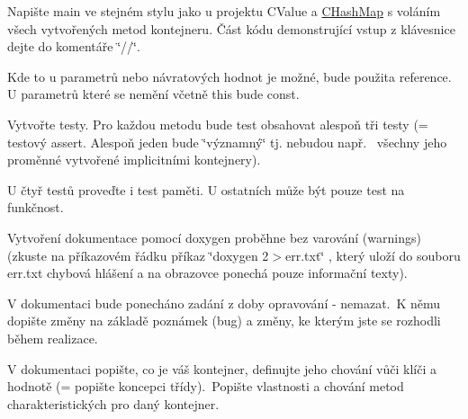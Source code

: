 \begin{DoxyEnumerate}
\item Napište main ve stejném stylu jako u projektu C\+Value a \hyperlink{class_c_hash_map}{C\+Hash\+Map} s voláním všech vytvořených metod kontejneru. Část kódu demonstrující vstup z klávesnice dejte do komentáře \char`\"{}//\char`\"{}.~\newline
~\newline

\item Kde to u parametrů nebo návratových hodnot je možné, bude použita reference. U parametrů které se nemění včetně {\ttfamily this} bude {\ttfamily const}.~\newline
~\newline

\item Vytvořte testy. Pro každou metodu bude test obsahovat alespoň tři testy (= testový {\ttfamily assert}. Alespoň jeden bude \char`\"{}významný\char`\"{} tj. nebudou např.\+  všechny jeho proměnné vytvořené implicitními kontejnery).~\newline
~\newline

\item U čtyř testů proveďte i test paměti. U ostatních může být pouze test na funkčnost.~\newline
~\newline

\item Vytvoření dokumentace pomocí doxygen proběhne bez varování (warnings) (zkuste na příkazovém řádku příkaz {\ttfamily \char`\"{}doxygen 2$>$err.\+txt\char`\"{}} , který uloží do souboru err.\+txt chybová hlášení a na obrazovce ponechá pouze informační texty).~\newline
~\newline

\item V dokumentaci bude ponecháno zadání z doby opravování -\/ nemazat.\+ K němu dopište změny na základě poznámek (bug) a změny, ke kterým jste se rozhodli během realizace.~\newline
~\newline

\item V dokumentaci popište, co je váš kontejner, definujte jeho chování vůči klíči a hodnotě (= popište koncepci třídy). \+Popište vlastnosti a chování metod charakteristických pro daný kontejner.~\newline
~\newline


\end{DoxyEnumerate}
